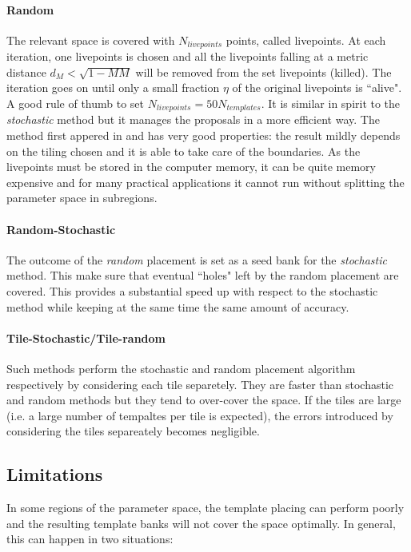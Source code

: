 \documentclass[twocolumn,showpacs,preprintnumbers,nofootinbib,prd,
superscriptaddress,10pt]{revtex4-2}
\begin{document}
\paragraph{Random}\label{par:random}
The relevant space is covered with $N_{livepoints}$ points, called livepoints. At each iteration, one livepoints is chosen and all the livepoints falling at a metric distance $d_M<\sqrt{1-MM}$ will be removed from the set livepoints (killed). The iteration goes on until only a small fraction $\eta$ of the original livepoints is ``alive". A good rule of thumb to set $N_{livepoints} = 50 N_{templates}$.
It is similar in spirit to the {\it stochastic} method but it manages the proposals in a more efficient way.
The method first appered in \cite{} and has very good properties: the result mildly depends on the tiling chosen and it is able to take care of the boundaries. As the livepoints must be stored in the computer memory, it can be quite memory expensive and for many practical applications it cannot run without splitting the parameter space in subregions.
\paragraph{Random-Stochastic}\label{par:randomstochastic}
The outcome of the {\it random} placement is set as a seed bank for the {\it stochastic} method. This make sure that eventual ``holes" left by the random placement are covered. This provides a substantial speed up with respect to the stochastic method while keeping at the same time the same amount of accuracy.
\paragraph{Tile-Stochastic/Tile-random}\label{par:tilerandom_stochastic}
Such methods perform the stochastic and random placement algorithm respectively by considering each tile separetely.
They are faster than stochastic and random methods but they tend to over-cover the space. If the tiles are large (i.e. a large number of tempaltes per tile is expected), the errors introduced by considering the tiles separeately becomes negligible.

\subsection{Limitations} \label{sec:limitations}

In some regions of the parameter space, the template placing can perform poorly and the resulting template banks will not cover the space optimally.
In general, this can happen in two situations:
\end{document}
